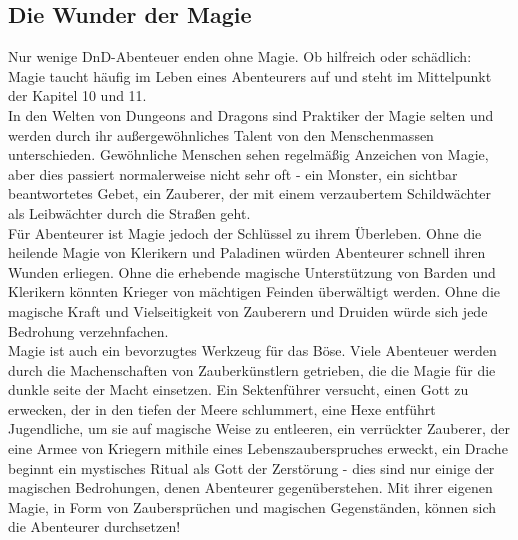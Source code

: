 \subsection{Die Wunder der Magie}
Nur wenige DnD-Abenteuer enden ohne Magie. Ob hilfreich oder schädlich: Magie taucht häufig im Leben eines Abenteurers auf und steht im Mittelpunkt der Kapitel 10 und 11.\\
In den Welten von Dungeons and Dragons sind Praktiker der Magie selten und werden durch ihr außergewöhnliches Talent von den Menschenmassen unterschieden. Gewöhnliche Menschen sehen regelmäßig Anzeichen von Magie, aber dies passiert normalerweise nicht sehr oft - ein Monster, ein sichtbar beantwortetes Gebet, ein Zauberer, der mit einem verzaubertem Schildwächter als Leibwächter durch die Straßen geht.\\
Für Abenteurer ist Magie jedoch der Schlüssel zu ihrem Überleben. Ohne die heilende Magie von Klerikern und Paladinen würden Abenteurer schnell ihren Wunden erliegen. Ohne die erhebende magische Unterstützung von Barden und Klerikern könnten Krieger von mächtigen Feinden überwältigt werden. Ohne die magische Kraft und Vielseitigkeit von Zauberern und Druiden würde sich jede Bedrohung verzehnfachen.\\
Magie ist auch ein bevorzugtes Werkzeug für das Böse. Viele Abenteuer werden durch die Machenschaften von Zauberkünstlern getrieben, die die Magie für die dunkle seite der Macht einsetzen. Ein Sektenführer versucht, einen Gott zu erwecken, der in den tiefen der Meere schlummert, eine Hexe entführt Jugendliche, um sie auf magische Weise zu entleeren, ein verrückter Zauberer, der eine Armee von Kriegern mithile eines Lebenszauberspruches erweckt, ein Drache beginnt ein mystisches Ritual als Gott der Zerstörung - dies sind nur einige der magischen Bedrohungen, denen Abenteurer gegenüberstehen. Mit ihrer eigenen Magie, in Form von Zaubersprüchen und magischen Gegenständen, können sich die Abenteurer durchsetzen!
